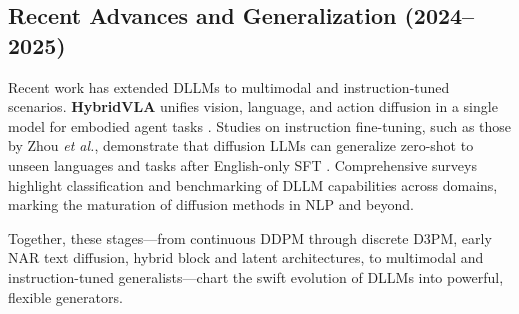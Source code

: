 \subsection{Recent Advances and Generalization (2024–2025)}
Recent work has extended DLLMs to multimodal and instruction-tuned scenarios. \textbf{HybridVLA} unifies vision, language, and action diffusion in a single model for embodied agent tasks \cite{liu_hybridvla_2025}. Studies on instruction fine-tuning, such as those by Zhou \emph{et al.}, demonstrate that diffusion LLMs can generalize zero-shot to unseen languages and tasks after English-only SFT \cite{nie_large_2025}. Comprehensive surveys highlight classification and benchmarking of DLLM capabilities across domains, marking the maturation of diffusion methods in NLP and beyond.

Together, these stages—from continuous DDPM through discrete D3PM, early NAR text diffusion, hybrid block and latent architectures, to multimodal and instruction-tuned generalists—chart the swift evolution of DLLMs into powerful, flexible generators.  

% 
% 
